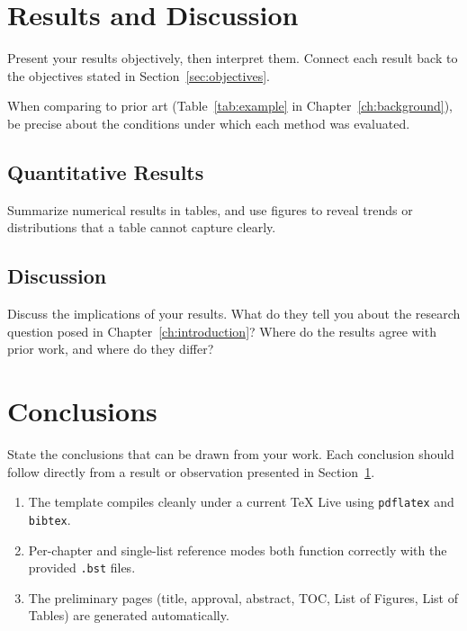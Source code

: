 \section{Results and Discussion}
\label{sec:results}

Present your results objectively, then interpret them.
Connect each result back to the objectives stated in
Section~\ref{sec:objectives}.

When comparing to prior art (Table~\ref{tab:example} in
Chapter~\ref{ch:background}), be precise about the conditions under
which each method was evaluated.

\subsection{Quantitative Results}
\label{subsec:quantitative}

Summarize numerical results in tables, and use figures to reveal
trends or distributions that a table cannot capture clearly.

\subsection{Discussion}
\label{subsec:discussion}

Discuss the implications of your results.
What do they tell you about the research question posed in
Chapter~\ref{ch:introduction}?
Where do the results agree with prior work, and where do they differ?

\section{Conclusions}
\label{sec:conclusions}

State the conclusions that can be drawn from your work.
Each conclusion should follow directly from a result or observation
presented in Section~\ref{sec:results}.

\begin{enumerate}
  \item The template compiles cleanly under a current TeX Live using
        \texttt{pdflatex} and \texttt{bibtex}.
  \item Per-chapter and single-list reference modes both function
        correctly with the provided \texttt{.bst} files.
  \item The preliminary pages (title, approval, abstract, TOC,
        List of Figures, List of Tables) are generated automatically.
\end{enumerate}

